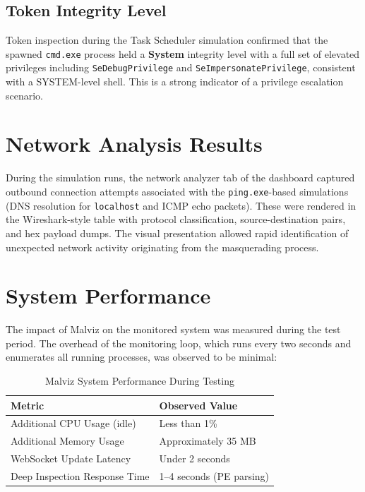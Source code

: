 \subsection{Token Integrity Level}

Token inspection during the Task Scheduler simulation confirmed that the spawned \texttt{cmd.exe} process held a \textbf{System} integrity level with a full set of elevated privileges including \texttt{SeDebugPrivilege} and \texttt{SeImpersonatePrivilege}, consistent with a SYSTEM-level shell. This is a strong indicator of a privilege escalation scenario.

\section{Network Analysis Results}

During the simulation runs, the network analyzer tab of the dashboard captured outbound connection attempts associated with the \texttt{ping.exe}-based simulations (DNS resolution for \texttt{localhost} and ICMP echo packets). These were rendered in the Wireshark-style table with protocol classification, source-destination pairs, and hex payload dumps. The visual presentation allowed rapid identification of unexpected network activity originating from the masquerading process.

\section{System Performance}

The impact of Malviz on the monitored system was measured during the test period. The overhead of the monitoring loop, which runs every two seconds and enumerates all running processes, was observed to be minimal:

\begin{table}[H]
\centering
\begin{tabular}{|l|l|}
\hline
\textbf{Metric} & \textbf{Observed Value} \\
\hline
Additional CPU Usage (idle) & Less than 1\% \\
Additional Memory Usage & Approximately 35 MB \\
WebSocket Update Latency & Under 2 seconds \\
Deep Inspection Response Time & 1--4 seconds (PE parsing) \\
\hline
\end{tabular}
\caption{Malviz System Performance During Testing}
\end{table}


